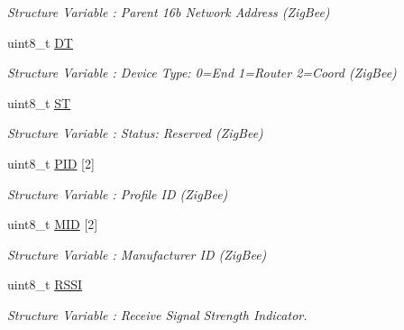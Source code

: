 \begin{DoxyCompactItemize}
\begin{DoxyCompactList}\small\item\em Structure Variable \+: Parent 16b Network Address (Zig\+Bee) \end{DoxyCompactList}\item 
uint8\+\_\+t \hyperlink{struct_node_a76c6151d67d519f93a41470b2032064a}{DT}\hypertarget{struct_node_a76c6151d67d519f93a41470b2032064a}{}\label{struct_node_a76c6151d67d519f93a41470b2032064a}

\begin{DoxyCompactList}\small\item\em Structure Variable \+: Device Type\+: 0=End 1=Router 2=Coord (Zig\+Bee) \end{DoxyCompactList}\item 
uint8\+\_\+t \hyperlink{struct_node_a48abb63e1bc80cca182fc1d2788a2bc6}{ST}\hypertarget{struct_node_a48abb63e1bc80cca182fc1d2788a2bc6}{}\label{struct_node_a48abb63e1bc80cca182fc1d2788a2bc6}

\begin{DoxyCompactList}\small\item\em Structure Variable \+: Status\+: Reserved (Zig\+Bee) \end{DoxyCompactList}\item 
uint8\+\_\+t \hyperlink{struct_node_a490d756fd5d30b280b3e4c04e15c29c0}{P\+ID} \mbox{[}2\mbox{]}\hypertarget{struct_node_a490d756fd5d30b280b3e4c04e15c29c0}{}\label{struct_node_a490d756fd5d30b280b3e4c04e15c29c0}

\begin{DoxyCompactList}\small\item\em Structure Variable \+: Profile ID (Zig\+Bee) \end{DoxyCompactList}\item 
uint8\+\_\+t \hyperlink{struct_node_a1011f833cc7a57a68e4ffeba6e0ec76c}{M\+ID} \mbox{[}2\mbox{]}\hypertarget{struct_node_a1011f833cc7a57a68e4ffeba6e0ec76c}{}\label{struct_node_a1011f833cc7a57a68e4ffeba6e0ec76c}

\begin{DoxyCompactList}\small\item\em Structure Variable \+: Manufacturer ID (Zig\+Bee) \end{DoxyCompactList}\item 
uint8\+\_\+t \hyperlink{struct_node_ab7882127b3d633d7413aa970a3882205}{R\+S\+SI}\hypertarget{struct_node_ab7882127b3d633d7413aa970a3882205}{}\label{struct_node_ab7882127b3d633d7413aa970a3882205}

\begin{DoxyCompactList}\small\item\em Structure Variable \+: Receive Signal Strength Indicator. \end{DoxyCompactList}\end{DoxyCompactItemize}


